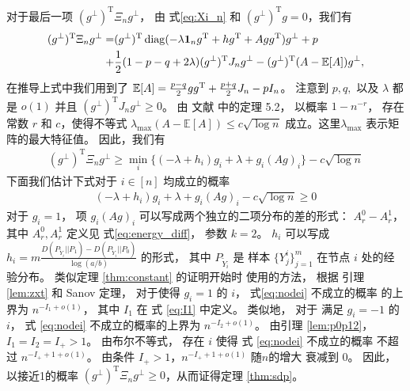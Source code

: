 对于最后一项 $(g^{\perp})^{\mathrm{T}} \Xi_n g^{\perp}$，
由 式\eqref{eq:Xi_n} 和 $(g^{\perp})^{\mathrm{T}}g=0$，我们有
\begin{align*}
    (g^{\perp})^{\mathrm{T}} \Xi_n g^{\perp} 
    =& (g^{\perp})^{\mathrm{T}} \operatorname{diag}( -\lambda \mathbf{1}_ng^{\mathrm{T}}+hg^{\mathrm{T}} + Agg^{\mathrm{T}}) g^{\perp} + p \\
    +& \frac{1}{2}(1-p-q+2\lambda)(g^{\perp})^{\mathrm{T}}J_n g^{\perp}
    -(g^{\perp})^{\mathrm{T}}(A-\operatorname{\mathbb{E}}[A])g^{\perp},
\end{align*}
在推导上式中我们用到了 $\operatorname{\mathbb{E}}[A] = \frac{p-q}{2}gg^{\mathrm{T}} + \frac{p+q}{2}J_n - pI_n$。
注意到 $p,q,$ 以及 $\lambda$ 都是 $o(1)$ 并且
$(g^{\perp})^{\mathrm{T}}J_n g^{\perp}\ge 0$。
由 文献 中的定理 5.2，
以概率 $1-n^{-r}$， 存在
常数 $r$ 和 $c$，使得不等式 $\lambda_{\max}(A-\mathbb{E}[A]) \leq c\sqrt{\log n}$
成立。这里$\lambda_{\max}$ 表示矩阵的最大特征值。
因此，我们有
\begin{align}\label{eq:lastterm}
    (g^{\perp})^{\mathrm{T}} \Xi_n g^{\perp} \geq \min_i\{(-\lambda + h_i) g_i+\lambda + g_i (Ag)_i \} - c \sqrt{\log n}
\end{align}
下面我们估计下式对于 $i\in [n]$ 均成立的概率
\begin{align}\label{eq:nodei}
    (-\lambda + h_i) g_i+\lambda + g_i (Ag)_i  - c \sqrt{\log n}\ge 0
\end{align}
对于 $g_i=1$，
项 $g_i(Ag)_i$ 可以写成两个独立的二项分布的差的形式：
$A_r^0-A_r^1$，其中 $A_r^0, A_r^1$ 定义见 式\eqref{eq:energy_diff}， 参数 $k=2$。
$h_i$ 可以写成 $h_i=m \frac{D(P_{\widetilde{Y}_i} || P_1) - D(P_{\widetilde{Y}_i} || P_0) }{\log (a /b)}$
的形式，
其中 $P_{\widetilde{Y}_i}$ 是
样本 $\{Y^i_j\}^m_{j=1}$ 在节点 $i$ 处的经验分布。
类似定理 \ref{thm:constant} 的证明开始时
使用的方法，
根据 引理 \ref{lem:zxt}  和  Sanov 定理，
对于使得 $g_i=1$ 的 $i$， 
式\eqref{eq:nodei} 不成立的概率
的上界为
$n^{-I_1 + o(1)}$，
其中 $I_1$ 在 式 \eqref{eq:I1} 中定义。
类似地，
对于 满足 $g_i=-1$ 的  $i$，
式 \eqref{eq:nodei} 不成立的概率的上界为 
$n^{-I_2 + o(1)}$。
由引理 \ref{lem:p0p12}，$I_1=I_2=I_+>1$。
由布尔不等式， 存在 $i$ 使得 式 \eqref{eq:nodei} 不成立的概率 不超过 $n^{-I_+ + 1 + o(1)}$。
由条件 $I_+>1$，$n^{-I_+ + 1 + o(1)}$ 随$n$的增大 衰减到 $0$。
因此，以接近1的概率 $(g^{\perp})^{\mathrm{T}} \Xi_n g^{\perp}\ge 0$，从而证得定理 \ref{thm:sdp}。 


